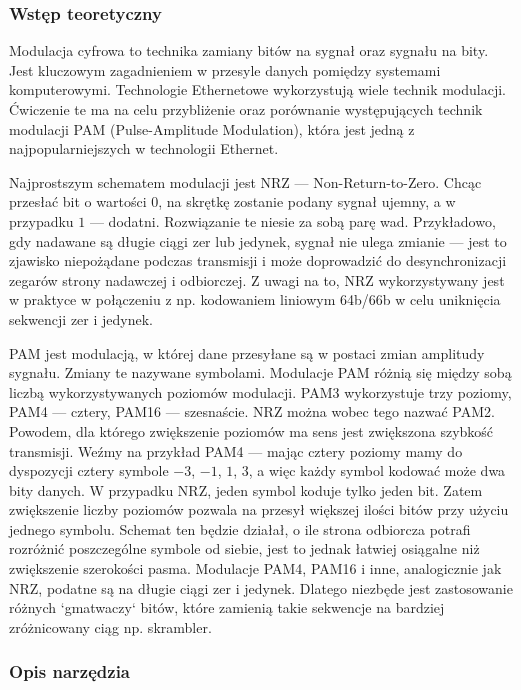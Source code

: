 \subsubsection{Wstęp teoretyczny}

Modulacja cyfrowa to technika zamiany bitów na sygnał oraz sygnału na bity. Jest kluczowym zagadnieniem w przesyle danych pomiędzy systemami
komputerowymi. Technologie Ethernetowe wykorzystują wiele technik modulacji. Ćwiczenie te ma na celu przybliżenie oraz porównanie
występujących technik modulacji PAM (Pulse-Amplitude Modulation), która jest jedną z najpopularniejszych w technologii Ethernet.

Najprostszym schematem modulacji jest NRZ --- Non-Return-to-Zero. Chcąc przesłać bit o wartości $0$, na skrętkę zostanie podany sygnał
ujemny, a w przypadku $1$ --- dodatni. Rozwiązanie te niesie za sobą parę wad. Przykładowo, gdy nadawane są długie ciągi zer lub jedynek, sygnał
nie ulega zmianie --- jest to zjawisko niepożądane podczas transmisji i może doprowadzić do desynchronizacji zegarów strony nadawczej i odbiorczej.
Z uwagi na to, NRZ wykorzystywany jest w praktyce w połączeniu z np. kodowaniem liniowym 64b/66b w celu uniknięcia sekwencji zer i jedynek.

PAM jest modulacją, w której dane przesyłane są w postaci zmian amplitudy sygnału. Zmiany te nazywane symbolami. Modulacje PAM różnią się między sobą
liczbą wykorzystywanych poziomów modulacji. PAM3 wykorzystuje trzy poziomy, PAM4 --- cztery, PAM16 --- szesnaście. NRZ można wobec tego nazwać PAM2.
Powodem, dla którego zwiększenie poziomów ma sens jest zwiększona szybkość transmisji. Weźmy na przykład PAM4 --- mając cztery poziomy mamy
do dyspozycji cztery symbole $-3$, $-1$, $1$, $3$, a więc każdy symbol kodować może dwa bity danych. W przypadku NRZ, jeden symbol koduje tylko jeden bit.
Zatem zwiększenie liczby poziomów pozwala na przesył większej ilości bitów przy użyciu jednego symbolu. Schemat ten będzie działał, o ile strona odbiorcza
potrafi rozróżnić poszczególne symbole od siebie, jest to jednak łatwiej osiągalne niż zwiększenie szerokości pasma.
Modulacje PAM4, PAM16 i inne, analogicznie jak NRZ, podatne są na długie ciągi zer i jedynek. Dlatego niezbęde jest zastosowanie różnych `gmatwaczy` bitów, które
zamienią takie sekwencje na bardziej zróżnicowany ciąg np. skrambler.

\subsubsection{Opis narzędzia}

